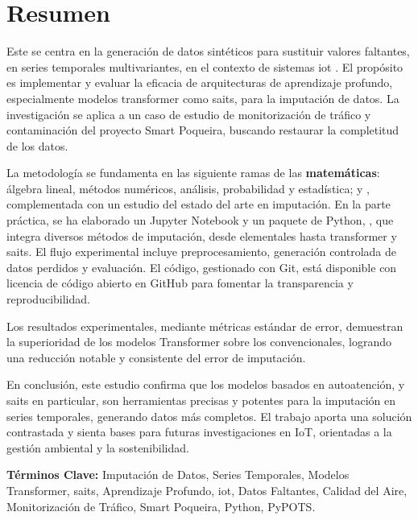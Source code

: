 \chapter*{Resumen}
\label{chap:resumen}
\glsresetall

Este  se centra en la generación de datos sintéticos para sustituir valores faltantes, en series temporales multivariantes, en el contexto de sistemas \gls{iot} . El propósito es implementar y evaluar la eficacia de arquitecturas de aprendizaje profundo, especialmente modelos transformer como \gls{saits}, para la imputación de datos. La investigación se aplica a un caso de estudio de monitorización de tráfico y contaminación del proyecto Smart Poqueira, buscando restaurar la completitud de los datos.

La metodología se fundamenta en las siguiente ramas de las \textbf{matemáticas}:  álgebra lineal, métodos numéricos, análisis, probabilidad y estadística; y \textbf{}, complementada con un estudio del estado del arte en imputación. En la parte práctica, se ha elaborado un Jupyter Notebook y un paquete de Python, \textbf{}, que integra diversos métodos de imputación, desde elementales hasta transformer y \gls{saits}. El flujo experimental incluye preprocesamiento, generación controlada de datos perdidos y evaluación. El código, gestionado con Git, está disponible con licencia de código abierto en GitHub para fomentar la transparencia y reproducibilidad.


Los resultados experimentales, mediante métricas estándar de error, demuestran la superioridad de los modelos Transformer sobre los convencionales, logrando una reducción notable y consistente del error de imputación. %

En conclusión, este estudio confirma que los modelos basados en autoatención, y \gls{saits} en particular, son herramientas precisas y potentes para la imputación en series temporales, generando datos más completos. El trabajo aporta una solución contrastada y sienta bases para futuras investigaciones en IoT, orientadas a la gestión ambiental y la sostenibilidad.

\vspace*{\fill}
\textbf{Términos Clave:} Imputación de Datos, Series Temporales, Modelos Transformer, \gls{saits}, Aprendizaje Profundo, \gls{iot}, Datos Faltantes, Calidad del Aire, Monitorización de Tráfico, Smart Poqueira, Python, PyPOTS.
\newpage %

